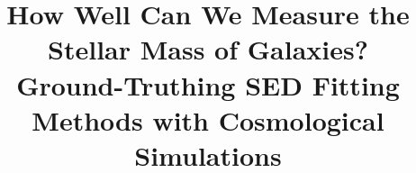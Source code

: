 \documentclass[twocolumn]{aastex62}
\begin{document}
\title{How Well Can We Measure the Stellar Mass of Galaxies? \\ Ground-Truthing SED Fitting Methods with Cosmological Simulations
}


\end{document}
